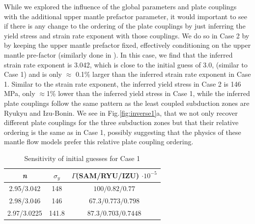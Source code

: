 \documentclass[12pt]{article}
\begin{document}
	
While we explored the influence of the global parameters and plate couplings with the additional upper mantle prefactor parameter, it would important to see if there is any change to the ordering of the plate couplings by just inferring the yield stress and strain rate exponent with those couplings. We do so in Case 2 by  by keeping the upper mantle prefactor fixed, effectively conditioning on the upper mantle pre-factor (similarly done in \citep{ratnaswamy2015adjoint}). In this case, we find that the inferred strain rate exponent is 3.042, which is close to the initial guess of 3.0, (similar to Case 1) and is only $\approx$ 0.1\% larger than the inferred strain rate exponent in Case 1. Similar to the strain rate exponent, the inferred yield stress in Case 2 is 146 MPa, only $\approx$1\% lower than the inferred yield stress in Case 1, while the inferred plate couplings follow the same pattern as the least coupled subduction zones are Ryukyu and Izu-Bonin. We see in Fig.\ref{fig:inverse1}a, that we not only recover different plate couplings for the three subduction zones but that their relative ordering is the same as in Case 1, possibly suggesting that the physics of these mantle flow models prefer this relative plate coupling ordering. 

\begin{table}[H]
		\caption{Sensitivity of initial guesses for Case 1} %
		\centering  %
		\begin{tabular}{ c c c } %
		\hline \hline                        %
		 \textit{n} &$\sigma_y$&$\Gamma $(SAM/RYU/IZU) $\cdot 10^{-5}$   \\ [0.5ex] %
		\hline                  %
	         2.95/3.042 & 148 & $100/0.82/0.77$    \\
	         2.98/3.046 & 146 & $67.3/0.773/0.798$  \\
	        2.97/3.0225 & 141.8 & $87.3/0.703/0.7448$  \\             
                \hline %
		\end{tabular}
		\label{table:initial_guess} %
		\end{table}
\end{document}
